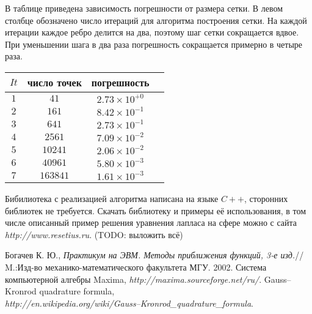 \documentclass[a4paper]{article}
\begin{document}
В таблице приведена зависимость погрешности от размера сетки. В левом
столбце обозначено число итераций для алгоритма построения сетки. На
каждой итерации каждое ребро делится на два, поэтому шаг сетки
сокращается вдвое. При уменьшении шага в два раза погрешность
сокращается примерно в четыре раза.
\begin{center}
\begin{tabular}{| c | c | c | c |}
\hline
$It$ & число точек & погрешность \\
\hline
$1$ & $41$     & $2.73\times10^{+0}$ \\
$2$ & $161$    & $8.42\times10^{-1}$ \\
$3$ & $641$    & $2.73\times10^{-1}$ \\
$4$ & $2561$   & $7.09\times10^{-2}$ \\
$5$ & $10241$  & $2.06\times10^{-2}$ \\
$6$ & $40961$  & $5.80\times10^{-3}$ \\
$7$ & $163841$ & $1.61\times10^{-3}$ \\
\hline
\end{tabular}
\end{center}

Бибилиотека с реализацией алгоритма написана на языке $C++$,
сторонних библиотек не требуется. Скачать библиотеку и примеры её
использования, в том числе описанный пример решения уравнения лапласа на сфере можно с
сайта {\it http://www.resetius.ru}. (TODO: выложить всё)

\begin{thebibliography}{999}
 Богачев К. Ю., {\it  Практикум на ЭВМ.  Методы
    приближения функций, 3-е изд.}// M.:Изд-во
  механико-математического факультета МГУ. 2002.
 Система компьютерной алгебры Maxima, {\it http://maxima.sourceforge.net/ru/}.
Gauss–Kronrod quadrature formula, \\ {\it
  http://en.wikipedia.org/wiki/Gauss–Kronrod\_quadrature\_formula}. 
\end{thebibliography}
\end{document}
